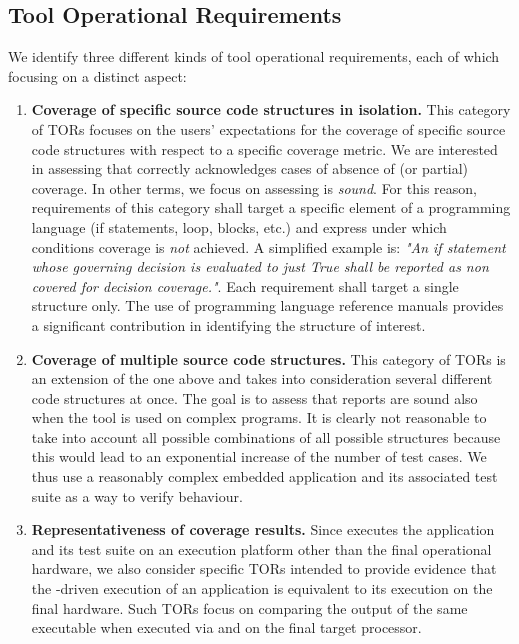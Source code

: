 \documentclass {report}
\begin{document}
\subsection{Tool Operational Requirements}
We identify three different kinds of tool operational requirements, each of which focusing on a distinct aspect:
\begin{enumerate}
\item \textbf{Coverage of specific source code structures in isolation.} This category of TORs focuses on the users' expectations for the coverage of specific source code structures with respect to a specific coverage metric. We are interested in assessing that \xcov correctly acknowledges cases of absence of (or partial) coverage. In other terms, we focus on assessing \xcov is \emph{sound}. For this reason, requirements of this category shall target a specific element of a programming language (if statements, loop, blocks, etc.) and express under which conditions coverage is \emph{not} achieved. A simplified example is: \emph{"An if statement whose governing decision is evaluated to just True shall be reported as non covered for decision coverage."}. Each requirement shall target a single structure only. The use of programming language reference manuals provides a significant contribution in identifying the structure of interest.

\item \textbf{Coverage of multiple source code structures.} This category of TORs is an extension of the one above and takes into consideration several different code structures at once. The goal is to assess that \xcov reports are sound also when the tool is used on complex programs. It is clearly not reasonable to take into account all possible combinations of all possible structures because this would lead to an exponential increase of the number of test cases. We thus use a reasonably complex embedded application and its associated test suite as a way to verify \xcov behaviour.

\item \textbf{Representativeness of coverage results.} Since \xcov executes the application and its test suite on an execution platform other than the final operational hardware, we also consider specific TORs intended to provide evidence that the \xcov-driven execution of an application is equivalent to its execution on the final hardware. Such TORs focus on comparing the output of the same executable when executed via \xcov and on the final target processor.
\end{enumerate}
\end{document}
